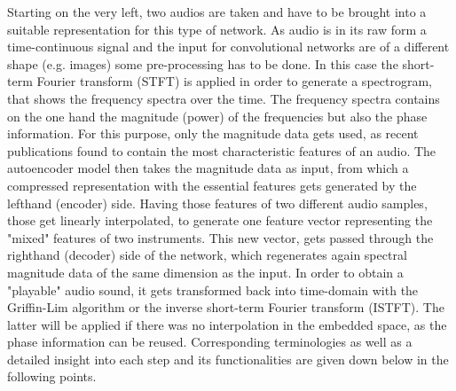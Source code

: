 Starting on the very left, two audios are taken and have to be brought into a suitable representation for this type of network. As audio is in its raw form a time-continuous signal and the input for convolutional networks are of a different shape (e.g. images) some pre-processing has to be done. In this case the short-term Fourier transform (STFT) is applied in order to generate a spectrogram, that shows the frequency spectra over the time. The frequency spectra contains on the one hand the magnitude (power) of the frequencies but also the phase information. For this purpose, only the magnitude data gets used, as recent publications found to contain the most characteristic features of an audio. The autoencoder model then takes the magnitude data as input, from which a compressed representation with the essential features gets generated by the lefthand (encoder) side. Having those features of two different audio samples, those get linearly interpolated, to generate one feature vector representing the "mixed" features of two instruments. This new vector, gets passed through the righthand (decoder) side of the network, which regenerates again spectral magnitude data of the same dimension as the input. In order to obtain a "playable" audio sound, it gets transformed back into time-domain with the Griffin-Lim algorithm \cite{Griffin1984} or the inverse short-term Fourier transform (ISTFT). The latter will be applied if there was no interpolation in the embedded space, as the phase information can be reused. Corresponding terminologies as well as a detailed insight into each step and its functionalities are given down below in the following points.

